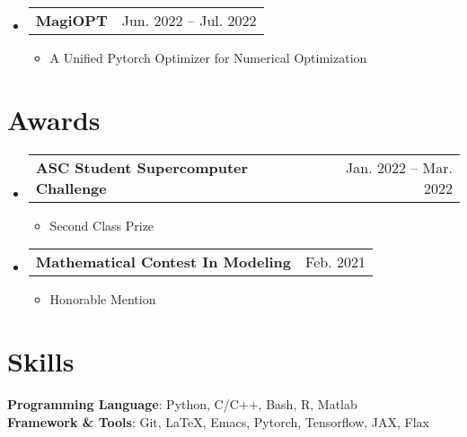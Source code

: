 \documentclass[letterpaper,11pt]{article}
\makeatletter
\newcommand{\resumeItem}[1]{
  \item\small{
    {#1 \vspace{-2pt}}
  }
}
\newcommand{\resumeProjectHeading}[2]{
  \vspace{-2pt}\item
    \begin{tabular*}{0.97\textwidth}[t]{l@{\extracolsep{\fill}}r}
      \textbf{#1} & #2 \\
    \end{tabular*}\vspace{-7pt}
}
\newcommand{\resumeAwardHeading}[2]{
  \vspace{-2pt}\item
    \begin{tabular*}{0.97\textwidth}[t]{l@{\extracolsep{\fill}}r}
      \textbf{#1} & #2 \\
    \end{tabular*}\vspace{-7pt}
}
\newcommand{\resumeSubHeadingListStart}{\begin{itemize}[leftmargin=0.15in, label={}]}
\newcommand{\resumeSubHeadingListEnd}{\end{itemize}}
\newcommand{\resumeItemListStart}{\begin{itemize}}
\newcommand{\resumeItemListEnd}{\end{itemize}\vspace{-5pt}}
\makeatother
\begin{document}
\begin{center}
    \resumeSubHeadingListStart

    \resumeProjectHeading
      {MagiOPT \href{https://github.com/MagiFeeney/MagiOPT}{\faicon{github}}}{Jun. 2022 -- Jul. 2022}
      \resumeItemListStart
        \resumeItem{A Unified Pytorch Optimizer for Numerical Optimization}
      \resumeItemListEnd
      \resumeSubHeadingListEnd
   
\end{center}



\section{Awards}
\begin{center}
    \resumeSubHeadingListStart
    
    \resumeAwardHeading
      { ASC Student Supercomputer Challenge}{Jan. 2022 -- Mar. 2022}
        \resumeItemListStart
        \resumeItem{Second Class Prize}
      \resumeItemListEnd
      
    \resumeAwardHeading    
      { Mathematical Contest In Modeling}{Feb. 2021}
        \resumeItemListStart
        \resumeItem{Honorable Mention}
      \resumeItemListEnd
      \resumeSubHeadingListEnd


\end{center}



\section{Skills}
 \begin{itemize}[leftmargin=0.15in, label={}]
    \small{\item{
     \textbf{Programming Language}{: Python, C/C++, Bash, R, Matlab} \\
     \textbf{Framework \& Tools}{: Git, LaTeX, Emacs, Pytorch, Tensorflow, JAX, Flax}
    }}
 \end{itemize}
\end{document}
